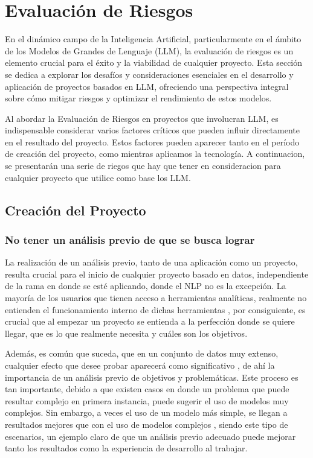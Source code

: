 
\chapter{Evaluación de Riesgos}

En el dinámico campo de la Inteligencia Artificial, particularmente en el ámbito de los Modelos de Grandes de Lenguaje (LLM), 
la evaluación de riesgos es un elemento crucial para el éxito y la viabilidad de cualquier proyecto. Esta sección se dedica 
a explorar los desafíos y consideraciones esenciales en el desarrollo y aplicación de proyectos basados en LLM, ofreciendo 
una perspectiva integral sobre cómo mitigar riesgos y optimizar el rendimiento de estos modelos.

Al abordar la Evaluación de Riesgos en proyectos que involucran LLM, es indispensable considerar varios factores críticos 
que pueden influir directamente en el resultado del proyecto. Estos factores pueden aparecer tanto en el período de creación
del proyecto, como mientras aplicamos la tecnología. A continuacion, se presentarán una serie de riegos que hay que tener en 
consideracion para cualquier proyecto que utilice como base los LLM.

\section{Creación del Proyecto}

\subsection{No tener un análisis previo de que se busca lograr}

La realización de un análisis previo, tanto de una aplicación como un proyecto, resulta crucial para el inicio de cualquier 
proyecto basado en datos, independiente de la rama en donde se esté aplicando, donde el NLP no es la excepción. 
La mayoría de los usuarios que tienen acceso a herramientas analíticas, realmente no entienden el funcionamiento interno de dichas herramientas \cite{datos1}, 
por consiguiente, es crucial que al empezar un proyecto se entienda a la perfección donde se quiere llegar, que es lo que realmente necesita y cuáles son los objetivos. 

Además, es común que suceda, que en un conjunto de datos muy extenso, cualquier efecto que desee probar aparecerá como significativo \cite{datos1}, de ahí la 
importancia de un análisis previo de objetivos y problemáticas. Este proceso es tan importante, debido a que existen casos en donde un problema que puede resultar complejo en 
primera instancia, puede sugerir el uso de modelos muy complejos. Sin embargo, a veces el uso de un modelo más simple, se llegan a resultados mejores 
que con el uso de modelos complejos \cite{datos2}, siendo este tipo de escenarios, un ejemplo claro de que un análisis previo adecuado puede mejorar tanto los resultados como la 
experiencia de desarrollo al trabajar. 

